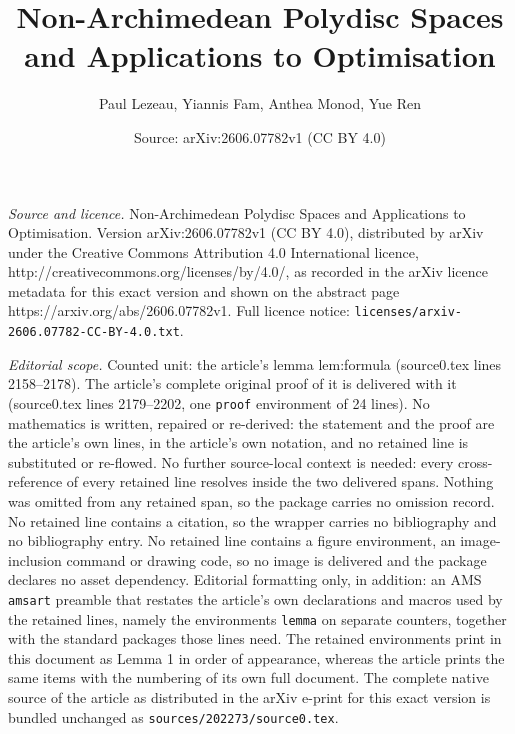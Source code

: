 \documentclass[10pt,a4paper]{amsart}
\title{Non-Archimedean Polydisc Spaces and Applications to Optimisation}
\author{Paul Lezeau, Yiannis Fam, Anthea Monod, Yue Ren}
\date{Source: arXiv:2606.07782v1 (CC BY 4.0)}
\begin{document}
\maketitle

\noindent\emph{Source and licence.} Non-Archimedean Polydisc Spaces and Applications to Optimisation. Version arXiv:2606.07782v1 (CC BY 4.0), distributed by arXiv under the Creative Commons Attribution 4.0 International licence, http://creativecommons.org/licenses/by/4.0/, as recorded in the arXiv licence metadata for this exact version and shown on the abstract page https://arxiv.org/abs/2606.07782v1. Full licence notice: \texttt{licenses/arxiv-2606.07782-CC-BY-4.0.txt}.\par\smallskip

\noindent\textit{Editorial scope.} Counted unit: the article's lemma lem:formula (source0.tex lines 2158--2178). The article's complete original proof of it is delivered with it (source0.tex lines 2179--2202, one \texttt{proof} environment of 24 lines). No mathematics is written, repaired or re-derived: the statement and the proof are the article's own lines, in the article's own notation, and no retained line is substituted or re-flowed.  No further source-local context is needed: every cross-reference of every retained line resolves inside the two delivered spans.  Nothing was omitted from any retained span, so the package carries no omission record.  No retained line contains a citation, so the wrapper carries no bibliography and no bibliography entry.  No retained line contains a figure environment, an image-inclusion command or drawing code, so no image is delivered and the package declares no asset dependency.  Editorial formatting only, in addition: an AMS \texttt{amsart} preamble that restates the article's own declarations and macros used by the retained lines, namely the environments \texttt{lemma} on separate counters, together with the standard packages those lines need.  The retained environments print in this document as Lemma 1 in order of appearance, whereas the article prints the same items with the numbering of its own full document.  The complete native source of the article as distributed in the arXiv e-print for this exact version is bundled unchanged as \texttt{sources/202273/source0.tex}.
\end{document}

